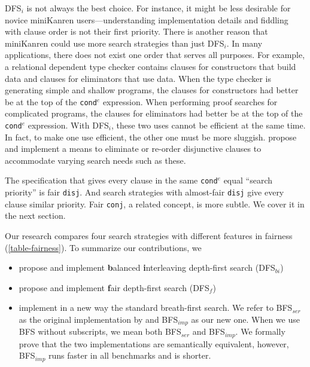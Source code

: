 \documentclass[acmlarge, review=true]{acmart}
\newcommand{\conde}{\texttt{cond$^e$}}
\newcommand{\conj}{\texttt{conj}}
\newcommand{\disj}{\texttt{disj}}
\newcommand{\DFSi }[0]{DFS$_{i}$}
\newcommand{\DFSf }[0]{DFS$_{f}$}
\newcommand{\DFSbi}[0]{DFS$_{bi}$}
\newcommand{\BFS}[0]{BFS}
\newcommand{\BFSser}[0]{BFS$_{ser}$}
\newcommand{\BFSimp}[0]{BFS$_{imp}$}
\begin{document}
\DFSi{} is not always the best choice. For instance, it might be less 
desirable for novice miniKanren users---understanding implementation details 
and fiddling with clause order is not their first priority. 
There is another reason that miniKanren could use more search strategies than
just \DFSi. In many applications, there does not exist one order that serves all
purposes. For example, a relational dependent type checker contains
clauses for constructors that build data and clauses for eliminators that use
data. When the type checker is generating simple and shallow programs,
the clauses for constructors had better be at the top of the
\conde{} expression.
When performing proof searches for complicated programs, the clauses for 
eliminators had better be at the top of the \conde{} expression. With \DFSi, 
these two uses cannot be efficient at the same time. In fact, to make one use 
efficient, the other one must be more sluggish. \citet{boskin} propose and 
implement a means to eliminate or re-order disjunctive clauses to accommodate 
varying search needs such as these.

The specification that gives every clause in the same \conde{} equal 
``search priority'' is fair \disj{}. And search strategies with 
almost-fair \disj{} give every clause similar priority. 
Fair \conj{}, a related concept, is more subtle. We cover it in the next 
section.


Our research compares four search strategies with different features in fairness
(\autoref{table-fairness}). To summarize our contributions, we
\begin{itemize}
	\item propose and implement \textbf{b}alanced \textbf{i}nterleaving 
	depth-first search (\DFSbi{})
	\item propose and implement \textbf{f}air depth-first search (\DFSf{})
	\item implement in a new way the standard breath-first search. 
	We refer to \BFSser{} as the original implementation by 
	\citet{seres1999algebra} and \BFSimp{} as our new 
	one. When we use BFS without subscripts, we mean both \BFSser{} and 
	\BFSimp{}.
	We formally prove that the two implementations are 
	semantically equivalent, however, \BFSimp{} runs faster in all benchmarks 
	and 
	is shorter.
\end{itemize}
\end{document}
